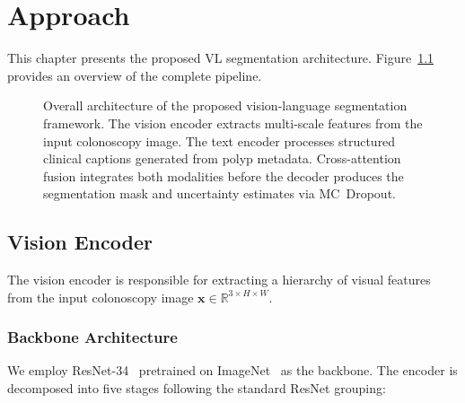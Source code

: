 
\chapter{Approach}
\label{ch:approach}

This chapter presents the proposed \ac{VL} segmentation architecture. Figure~\ref{fig:architecture} provides an overview of the complete pipeline.

\begin{figure}[htbp]
	\centering
	\caption[Overall architecture of the VL segmentation framework.]{Overall architecture of the proposed vision-language segmentation framework. The vision encoder extracts multi-scale features from the input colonoscopy image. The text encoder processes structured clinical captions generated from polyp metadata. Cross-attention fusion integrates both modalities before the decoder produces the segmentation mask and uncertainty estimates via MC~Dropout.}
	\label{fig:architecture}
\end{figure}


\section{Vision Encoder}
\label{sec:approach:vision}

The vision encoder is responsible for extracting a hierarchy of visual features from the input colonoscopy image $\mathbf{x} \in \mathbb{R}^{3 \times H \times W}$.

\subsection{Backbone Architecture}
\label{sec:approach:backbone}

We employ \ac{ResNet}-34~\cite{he2016deep} pretrained on ImageNet~\cite{deng2009imagenet} as the backbone. The encoder is decomposed into five stages following the standard ResNet grouping:

